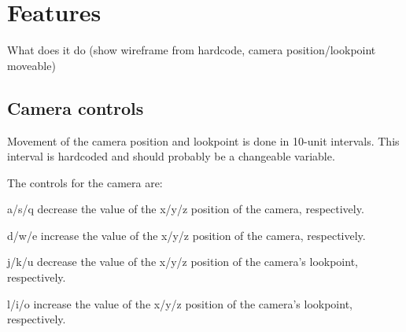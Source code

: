 \section{Features}
What does it do (show wireframe from hardcode, camera position/lookpoint moveable)

\subsection{Camera controls}
Movement of the camera position and lookpoint is done in 10-unit intervals. This interval is hardcoded and should probably be a changeable variable.

The controls for the camera are:
\begin{my_itemize}
\item a/s/q decrease the value of the x/y/z position of the camera, respectively.
\item d/w/e increase the value of the x/y/z position of the camera, respectively.
\item j/k/u decrease the value of the x/y/z position of the camera's lookpoint, respectively.
\item l/i/o increase the value of the x/y/z position of the camera's lookpoint, respectively.
\end{my_itemize}